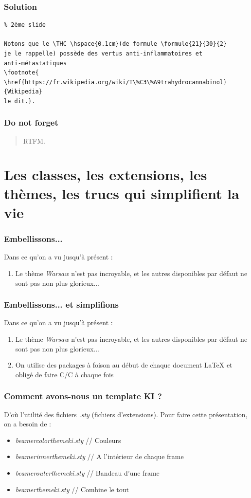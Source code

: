 \documentclass[handout]{beamer}
\newcommand{\THC}{tétrahydrocannabinol}
\newcommand{\formule}[3]{\textbf{C}\textsubscript{#1}\textbf{H}\textsubscript{#2}\textbf{O}\textsubscript{#3}}
\begin{document}
\begin{frame}[fragile=singleslide]
\frametitle{Solution}
\footnotesize
\begin{verbatim}
% 2ème slide

Notons que le \THC \hspace{0.1cm}(de formule \formule{21}{30}{2} 
je le rappelle) possède des vertus anti-inflammatoires et 
anti-métastatiques 
\footnote{
\href{https://fr.wikipedia.org/wiki/T\%C3\%A9trahydrocannabinol}
{Wikipedia} 
le dit.}.

\end{verbatim}
\end{frame}

\begin{frame}
	\frametitle{Do not forget}
	\centering
	\begin{quote}
		RTFM.
	\end{quote}
\end{frame}

\section{Les classes, les extensions, les thèmes, les trucs qui simplifient la vie}

\begin{frame}
\frametitle{Embellissons...}
Dans ce qu'on a vu jusqu'à présent :
\begin{enumerate}
	\item Le thème \textit{Warsaw} n'est pas incroyable, et les autres disponibles par défaut ne sont pas non plus glorieux...
\end{enumerate}
\end{frame}

\begin{frame}
\frametitle{Embellissons... et simplifions}
Dans ce qu'on a vu jusqu'à présent :
\begin{enumerate}
	\item Le thème \textit{Warsaw} n'est pas incroyable, et les autres disponibles par défaut ne sont pas non plus glorieux...
	\item On utilise des packages à foison au début de chaque document \LaTeX \vspace{1cm} et obligé de faire C/C à chaque fois
\end{enumerate}
\end{frame}

\begin{frame}
\frametitle{Comment avons-nous un template KI ?}
	D'où l'utilité des fichiers \textit{.sty} (fichiers d'extensions). Pour faire cette présentation, on a besoin de :
	\begin{itemize}
		\item \textit{beamercolorthemeki.sty} // Couleurs
		\item \textit{beamerinnerthemeki.sty} // A l'intérieur de chaque frame
		\item \textit{beamerouterthemeki.sty} // Bandeau d'une frame
		\item \textit{beamerthemeki.sty} // Combine le tout
	\end{itemize}
\end{frame}
\end{document}
